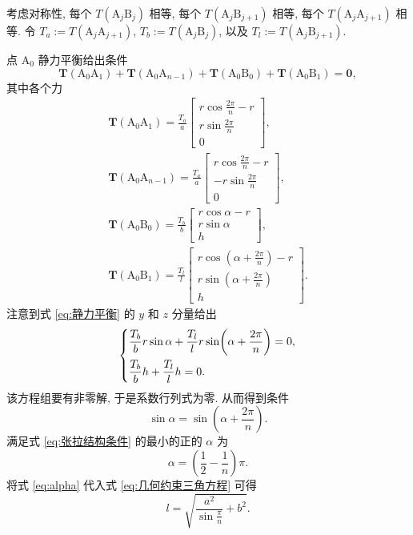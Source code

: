 \documentclass{article}
\begin{document}
考虑对称性, 每个 $T\!\left(\mathrm A_j\mathrm B_j\right)$ 相等,
每个 $T\!\left(\mathrm A_j\mathrm B_{j+1}\right)$ 相等,
每个 $T\!\left(\mathrm A_j\mathrm A_{j+1}\right)$ 相等.
令 $T_a:=T\!\left(\mathrm A_j\mathrm A_{j+1}\right)$,
$T_b:=T\!\left(\mathrm A_j\mathrm B_j\right)$,
以及 $T_l:=T\!\left(\mathrm A_j\mathrm B_{j+1}\right)$.

点 $\mathrm A_0$ 静力平衡给出条件
\begin{equation}
	\mathbf T\!\left(\mathrm A_0\mathrm A_1\right)+
	\mathbf T\!\left(\mathrm A_0\mathrm A_{n-1}\right)+
	\mathbf T\!\left(\mathrm A_0\mathrm B_0\right)+
	\mathbf T\!\left(\mathrm A_0\mathrm B_1\right)=\mathbf0,
	\label{eq:静力平衡}
\end{equation}
其中各个力
\begin{gather}
	\mathbf T\!\left(\mathrm A_0\mathrm A_1\right)=\frac{T_a}a
	\left[\begin{matrix}r\cos\frac{2\pi}n-r\\r\sin\frac{2\pi}n\\0\end{matrix}\right],\\
	\mathbf T\!\left(\mathrm A_0\mathrm A_{n-1}\right)=\frac{T_a}a
	\left[\begin{matrix}r\cos\frac{2\pi}n-r\\-r\sin\frac{2\pi}n\\0\end{matrix}\right],\\
	\mathbf T\!\left(\mathrm A_0\mathrm B_0\right)=\frac{T_b}b
	\left[\begin{matrix}r\cos\alpha-r\\r\sin\alpha\\h\end{matrix}\right],\\
	\mathbf T\!\left(\mathrm A_0\mathrm B_1\right)=\frac{T_l}l
	\left[\begin{matrix}r\cos\!\left(\alpha+\frac{2\pi}n\right)-r\\r\sin\!\left(\alpha+\frac{2\pi}n\right)\\h\end{matrix}\right].
\end{gather}
注意到式 \ref{eq:静力平衡} 的 $y$ 和 $z$ 分量给出
\begin{equation}
	\begin{dcases}
		\frac{T_b}br\sin\alpha+\frac{T_l}lr\sin\!\left(\alpha+\frac{2\pi}n\right)=0,\\
		\frac{T_b}bh+\frac{T_l}lh=0.
	\end{dcases}
\end{equation}
该方程组要有非零解, 于是系数行列式为零. 从而得到条件
\begin{equation}
	\sin\alpha=\sin\!\left(\alpha+\frac{2\pi}n\right).
	\label{eq:张拉结构条件}
\end{equation}
满足式 \ref{eq:张拉结构条件} 的最小的正的 $\alpha$ 为
\begin{equation}
	\alpha=\left(\frac12-\frac1n\right)\pi.
	\label{eq:alpha}
\end{equation}
将式 \ref{eq:alpha} 代入式 \ref{eq:几何约束三角方程} 可得
\begin{equation}
	l=\sqrt{\frac{a^2}{\sin\frac\pi n}+b^2}.
\end{equation}
\end{document}
